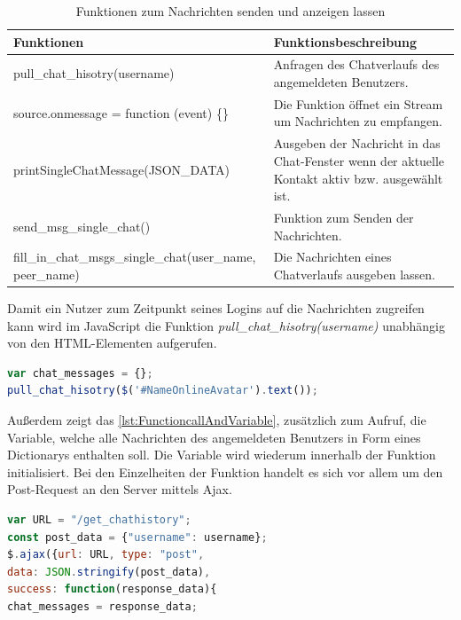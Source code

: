 \documentclass[a4paper,titlepage,halfparskip,12pt]{scrreprt}
\begin{document}
\begin{onehalfspacing}
\begin{table}[h]
	\centering
	\caption{Funktionen zum Nachrichten senden und anzeigen lassen}
	\begin{tabular}{|p{6cm}|p{8.8cm}|}
		\hline
		\textbf{Funktionen} & \textbf{Funktionsbeschreibung} \\
		\hline
		pull\_chat\_hisotry(username) & Anfragen des Chatverlaufs des angemeldeten Benutzers.\\
		\hline
		source.onmessage = function (event) \{\} & Die Funktion öffnet ein \glqq Stream\grqq{} um Nachrichten zu empfangen.\\
		\hline
		printSingleChatMessage\linebreak(JSON\_DATA) & Ausgeben der Nachricht in das Chat-Fenster wenn der aktuelle Kontakt aktiv bzw. ausgewählt ist.\\
		\hline
		send\_msg\_single\_chat() & Funktion zum Senden der Nachrichten.\\
		\hline
		fill\_in\_chat\_msgs\_single\_chat\linebreak(user\_name, peer\_name) & Die Nachrichten eines Chatverlaufs ausgeben lassen.\\
		\hline
	\end{tabular}
	\label{tab:FunctionsForMessagesJS}
\end{table}
Damit ein Nutzer zum Zeitpunkt seines Logins auf die Nachrichten zugreifen kann wird im JavaScript die Funktion \textit{pull\_chat\_hisotry(username)} unabhängig von den \ac{HTML}-Elementen aufgerufen.
\begin{lstlisting}[language=Javascript,caption=Aufruf der Funktion mit der relevanten Variablen dekleration,label={lst:FunctioncallAndVariable}]
var chat_messages = {};
pull_chat_hisotry($('#NameOnlineAvatar').text());
\end{lstlisting}
Außerdem zeigt das \autoref{lst:FunctioncallAndVariable}, zusätzlich zum Aufruf, die Variable, welche alle Nachrichten des angemeldeten Benutzers in Form eines Dictionarys enthalten soll. Die Variable wird wiederum innerhalb der Funktion initialisiert. Bei den Einzelheiten der Funktion handelt es sich vor allem um den Post-Request an den Server mittels Ajax. 
\begin{lstlisting}[language=Javascript,caption=Ausschnitt aus der Funktion \textit{pull\_chat\_hisotry(username)} ,label={lst:FunctionChathistory}]
var URL = "/get_chathistory";
const post_data = {"username": username};
$.ajax({url: URL, type: "post",
data: JSON.stringify(post_data),
success: function(response_data){
chat_messages = response_data;

\end{lstlisting}
\end{onehalfspacing}
\end{document}
